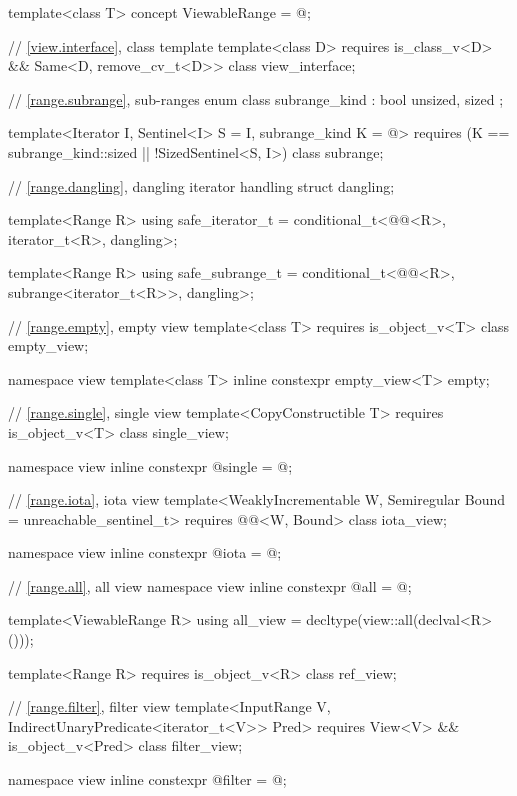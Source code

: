 \begin{codeblock}
{  template<class T>
    concept ViewableRange = @\seebelow@;

  // \ref{view.interface}, class template 
  template<class D>
    requires is_class_v<D> && Same<D, remove_cv_t<D>>
  class view_interface;

  // \ref{range.subrange}, sub-ranges
  enum class subrange_kind : bool { unsized, sized };

  template<Iterator I, Sentinel<I> S = I, subrange_kind K = @\seebelow@>
    requires (K == subrange_kind::sized || !SizedSentinel<S, I>)
  class subrange;

  // \ref{range.dangling}, dangling iterator handling
  struct dangling;

  template<Range R>
    using safe_iterator_t = conditional_t<@@<R>, iterator_t<R>, dangling>;

  template<Range R>
    using safe_subrange_t =
      conditional_t<@@<R>, subrange<iterator_t<R>>, dangling>;

  // \ref{range.empty}, empty view
  template<class T>
    requires is_object_v<T>
  class empty_view;

  namespace view {
    template<class T>
      inline constexpr empty_view<T> empty{};
  }

  // \ref{range.single}, single view
  template<CopyConstructible T>
    requires is_object_v<T>
  class single_view;

  namespace view { inline constexpr @\unspec@ single = @\unspec@; }

  // \ref{range.iota}, iota view
  template<WeaklyIncrementable W, Semiregular Bound = unreachable_sentinel_t>
    requires @@<W, Bound>
  class iota_view;

  namespace view { inline constexpr @\unspec@ iota = @\unspec@; }

  // \ref{range.all}, all view
  namespace view { inline constexpr @\unspec@ all = @\unspec@; }

  template<ViewableRange R>
    using all_view = decltype(view::all(declval<R>()));

  template<Range R>
    requires is_object_v<R>
  class ref_view;

  // \ref{range.filter}, filter view
  template<InputRange V, IndirectUnaryPredicate<iterator_t<V>> Pred>
    requires View<V> && is_object_v<Pred>
  class filter_view;

  namespace view { inline constexpr @\unspec@ filter = @\unspec@; }

}
\end{codeblock}
